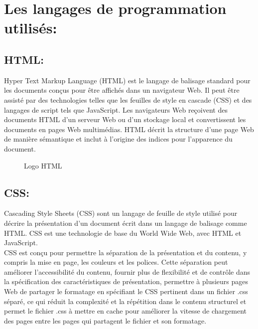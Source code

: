 \documentclass[12pt]{report}
\begin{document}
\section{Les langages de programmation utilisés:}

\subsection{HTML:}

Hyper Text Markup Language (HTML) est le langage de balisage standard pour les documents conçus pour être affichés dans un navigateur Web. Il peut être assisté par des technologies telles que les feuilles de style en cascade (CSS) et des langages de script tels que JavaScript.
Les navigateurs Web reçoivent des documents HTML d'un serveur Web ou d'un stockage local et convertissent les documents en pages Web multimédias. HTML décrit la structure d'une page Web de manière sémantique et inclut à l'origine des indices pour l'apparence du document.

\vspace{0.6in}

\begin{figure}[h]
\centering
\caption{Logo HTML}
\end{figure}

\newpage

\subsection{CSS:}

Cascading Style Sheets (CSS) sont un langage de feuille de style utilisé pour décrire la présentation d'un document écrit dans un langage de balisage comme HTML. CSS est une technologie de base du World Wide Web, avec HTML et JavaScript.
\\
CSS est conçu pour permettre la séparation de la présentation et du contenu, y compris la mise en page, les couleurs et les polices. Cette séparation peut améliorer l'accessibilité du contenu, fournir plus de flexibilité et de contrôle dans la spécification des caractéristiques de présentation, permettre à plusieurs pages Web de partager le formatage en spécifiant le CSS pertinent dans un fichier .css séparé, ce qui réduit la complexité et la répétition dans le contenu structurel et permet le fichier .css à mettre en cache pour améliorer la vitesse de chargement des pages entre les pages qui partagent le fichier et son formatage.
\end{document}
